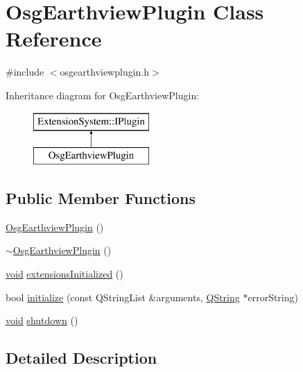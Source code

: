 \hypertarget{class_osg_earthview_plugin}{\section{\-Osg\-Earthview\-Plugin \-Class \-Reference}
\label{class_osg_earthview_plugin}
}


{\ttfamily \#include $<$osgearthviewplugin.\-h$>$}

\-Inheritance diagram for \-Osg\-Earthview\-Plugin\-:\begin{figure}[H]
\begin{center}
\leavevmode
\includegraphics[height=2.000000cm]{class_osg_earthview_plugin}
\end{center}
\end{figure}
\subsection*{\-Public \-Member \-Functions}
\begin{DoxyCompactItemize}
\item 
\hyperlink{group___o_s_g_earth_view_pluging_ga695dc06ca46ce6939cf95ef27f90be72}{\-Osg\-Earthview\-Plugin} ()
\item 
\hyperlink{group___o_s_g_earth_view_pluging_ga67b03faca8613bf17a0623ae18791913}{$\sim$\-Osg\-Earthview\-Plugin} ()
\item 
\hyperlink{group___u_a_v_objects_plugin_ga444cf2ff3f0ecbe028adce838d373f5c}{void} \hyperlink{group___o_s_g_earth_view_pluging_ga67c92e6b50be6d0152700ea331726933}{extensions\-Initialized} ()
\item 
bool \hyperlink{group___o_s_g_earth_view_pluging_gad25998380d6a05042f2a787e6ea00cee}{initialize} (const \-Q\-String\-List \&arguments, \hyperlink{group___u_a_v_objects_plugin_gab9d252f49c333c94a72f97ce3105a32d}{\-Q\-String} $\ast$error\-String)
\item 
\hyperlink{group___u_a_v_objects_plugin_ga444cf2ff3f0ecbe028adce838d373f5c}{void} \hyperlink{group___o_s_g_earth_view_pluging_gac453d0b59f26d74b1a48cf92c59b9d8e}{shutdown} ()
\end{DoxyCompactItemize}


\subsection{\-Detailed \-Description}


